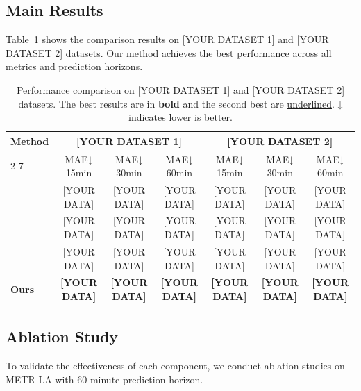 \documentclass[journal,10pt]{IEEEtran}
\begin{document}
\subsection{Main Results}
\label{sec:results}

Table~\ref{tab:main} shows the comparison results on [YOUR DATASET 1] and [YOUR DATASET 2] datasets.
Our method achieves the best performance across all metrics and prediction horizons.


\begin{table}[!t]
\centering
\caption{Performance comparison on [YOUR DATASET 1] and [YOUR DATASET 2] datasets.
The best results are in \textbf{bold} and the second best are \underline{underlined}.
↓ indicates lower is better.}
\label{tab:main}
\begin{tabular}{l|ccc|ccc}
\toprule
\multirow{2}{*}{Method} & \multicolumn{3}{c|}{[YOUR DATASET 1]} & \multicolumn{3}{c}{[YOUR DATASET 2]} \\
\cmidrule{2-7}
& MAE↓ 15min & MAE↓ 30min & MAE↓ 60min & MAE↓ 15min & MAE↓ 30min & MAE↓ 60min \\
\midrule
[Baseline 1] & [YOUR DATA] & [YOUR DATA] & [YOUR DATA] & [YOUR DATA] & [YOUR DATA] & [YOUR DATA] \\
[Baseline 2] & [YOUR DATA] & [YOUR DATA] & [YOUR DATA] & [YOUR DATA] & [YOUR DATA] & [YOUR DATA] \\
[Baseline 3] & [YOUR DATA] & [YOUR DATA] & [YOUR DATA] & [YOUR DATA] & [YOUR DATA] & [YOUR DATA] \\
\midrule
\textbf{Ours} & \textbf{[YOUR DATA]} & \textbf{[YOUR DATA]} & \textbf{[YOUR DATA]} & \textbf{[YOUR DATA]} & \textbf{[YOUR DATA]} & \textbf{[YOUR DATA]} \\
\bottomrule
\end{tabular}
\end{table}

\subsection{Ablation Study}
\label{sec:ablation}

To validate the effectiveness of each component, we conduct ablation studies
on METR-LA with 60-minute prediction horizon.

\end{document}

